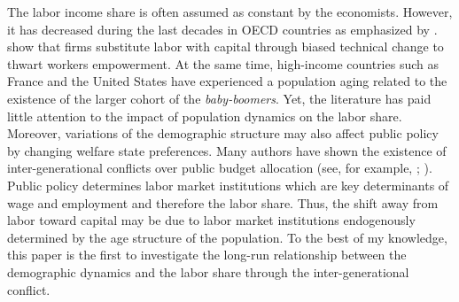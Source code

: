 

The labor income share is often assumed as constant by the economists. However, it has decreased during the last decades in OECD countries as emphasized by \cite{Karabarbounis2014}.
\cite{Caballero1998} show that firms substitute labor with capital through biased technical change to thwart workers empowerment.
At the same time, high-income countries such as France and the United States have experienced a population aging related to the existence of the larger cohort of the \textit{baby-boomers}.
Yet, the literature has paid little attention to the impact of population dynamics on the labor share. 
Moreover, variations of the demographic structure may also affect public policy by changing welfare state preferences. Many authors have shown the existence of inter-generational conflicts over public budget allocation (see, for example, \citealt{Busemeyer2009}; \citealt{Sorensen2013}). 
Public policy determines labor market institutions which are key determinants of wage and employment and therefore the labor share. Thus, the shift away from labor toward capital may be due to labor market institutions endogenously determined by the age structure of the population.
To the best of my knowledge, this paper is the first to investigate the long-run relationship between the demographic dynamics and the labor share through the inter-generational conflict.


